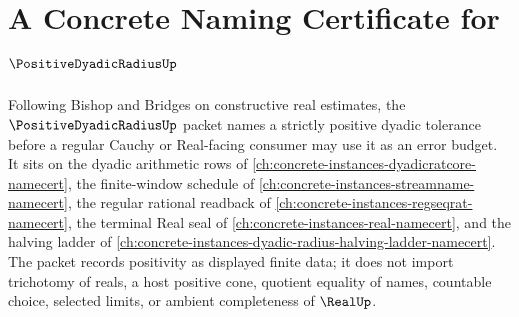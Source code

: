 \chapter{A Concrete Naming Certificate for $\PositiveDyadicRadiusUp$}
\label{ch:concrete-instances-positive-dyadic-radius-namecert}

Following Bishop and Bridges on constructive real estimates, the $\PositiveDyadicRadiusUp$ packet names a strictly positive dyadic tolerance before a regular Cauchy or Real-facing consumer may use it as an error budget. It sits on the dyadic arithmetic rows of \autoref{ch:concrete-instances-dyadicratcore-namecert}, the finite-window schedule of \autoref{ch:concrete-instances-streamname-namecert}, the regular rational readback of \autoref{ch:concrete-instances-regseqrat-namecert}, the terminal Real seal of \autoref{ch:concrete-instances-real-namecert}, and the halving ladder of \autoref{ch:concrete-instances-dyadic-radius-halving-ladder-namecert}. The packet records positivity as displayed finite data; it does not import trichotomy of reals, a host positive cone, quotient equality of names, countable choice, selected limits, or ambient completeness of $\RealUp$.

